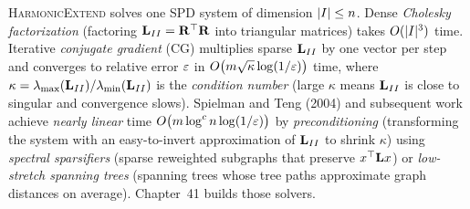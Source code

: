 \begin{complexitybox}
\textsc{HarmonicExtend} solves one SPD system of dimension $\lvert I\rvert\le n$. Dense \emph{Cholesky factorization} (factoring $\mathbf{L}_{II} = \mathbf{R}^\top\mathbf{R}$ into triangular matrices) takes $O(\lvert I\rvert^3)$ time. Iterative \emph{conjugate gradient} (CG) multiplies sparse $\mathbf{L}_{II}$ by one vector per step and converges to relative error $\varepsilon$ in $O\bigl(m\sqrt{\kappa}\log(1/\varepsilon)\bigr)$ time, where $\kappa = \lambda_{\max}(\mathbf{L}_{II})/\lambda_{\min}(\mathbf{L}_{II})$ is the \emph{condition number} (large $\kappa$ means $\mathbf{L}_{II}$ is close to singular and convergence slows). Spielman and Teng (2004) and subsequent work achieve \emph{nearly linear} time $O\bigl(m\log^{c}n\log(1/\varepsilon)\bigr)$ by \emph{preconditioning} (transforming the system with an easy-to-invert approximation of $\mathbf{L}_{II}$ to shrink $\kappa$) using \emph{spectral sparsifiers} (sparse reweighted subgraphs that preserve $x^\top\mathbf{L} x$) or \emph{low-stretch spanning trees} (spanning trees whose tree paths approximate graph distances on average). Chapter~41 builds those solvers.
\end{complexitybox}

